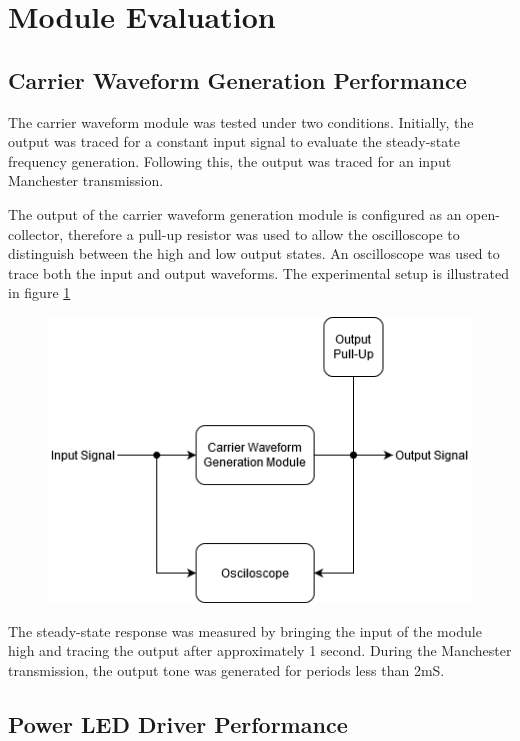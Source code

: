 


\section{Module Evaluation}

\subsection{Carrier Waveform Generation Performance}
The carrier waveform module was tested under two conditions. Initially, the output was traced for a constant input signal to evaluate the steady-state frequency generation. Following this, the output was traced for an input Manchester transmission.

The output of the carrier waveform generation module is configured as an open-collector, therefore a pull-up resistor was used to allow the oscilloscope to distinguish between the high and low output states. An oscilloscope was used to trace both the input and output waveforms. The experimental setup is illustrated in figure \ref{fig:carrier_generation_module_experiment_setup}

\begin{figure}[H]
	\centering
	\includegraphics[width=.5\linewidth]{figures/experimentation/carrier_generation_module_experiment.png}
	\label{fig:carrier_generation_module_experiment_setup}
\end{figure}

The steady-state response was measured by bringing the input of the module high and tracing the output after approximately 1 second. During the Manchester transmission, the output tone was generated for periods less than 2mS.





\subsection{Power LED Driver Performance}

